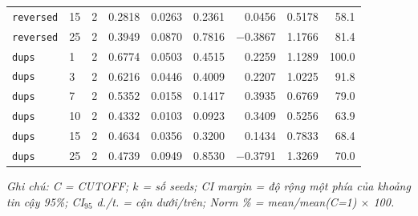 \documentclass[12pt, a4paper]{article}
\begin{document}
\begin{table}[H]
\begin{tabular}{llrrrrrrr}
\texttt{reversed} & 15 & 2 & 0.2818 & 0.0263 & 0.2361 &  0.0456 & 0.5178 & 58.1 \\
\texttt{reversed} & 25 & 2 & 0.3949 & 0.0870 & 0.7816 & $-$0.3867 & 1.1766 & 81.4 \\
\midrule
\texttt{dups}     & 1  & 2 & 0.6774 & 0.0503 & 0.4515 &  0.2259 & 1.1289 & 100.0 \\
\texttt{dups}     & 3  & 2 & 0.6216 & 0.0446 & 0.4009 &  0.2207 & 1.0225 & 91.8 \\
\texttt{dups}     & 7  & 2 & 0.5352 & 0.0158 & 0.1417 &  0.3935 & 0.6769 & 79.0 \\
\texttt{dups}     & 10 & 2 & 0.4332 & 0.0103 & 0.0923 &  0.3409 & 0.5256 & 63.9 \\
\texttt{dups}     & 15 & 2 & 0.4634 & 0.0356 & 0.3200 &  0.1434 & 0.7833 & 68.4 \\
\texttt{dups}     & 25 & 2 & 0.4739 & 0.0949 & 0.8530 & $-$0.3791 & 1.3269 & 70.0 \\
\bottomrule
\end{tabular}
\end{table}

\noindent\textit{Ghi chú: C = CUTOFF; $k$ = số seeds; CI margin = độ rộng một phía của
khoảng tin cậy 95\%; CI$_{95}$ d./t. = cận dưới/trên; Norm \% = mean/mean(C=1) $\times$ 100.}
\end{document}
